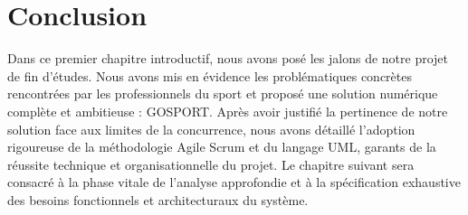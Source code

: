 \section{Conclusion}
Dans ce premier chapitre introductif, nous avons posé les jalons de notre projet de fin d'études. Nous avons mis en évidence les problématiques concrètes rencontrées par les professionnels du sport et proposé une solution numérique complète et ambitieuse : GOSPORT. Après avoir justifié la pertinence de notre solution face aux limites de la concurrence, nous avons détaillé l'adoption rigoureuse de la méthodologie Agile Scrum et du langage UML, garants de la réussite technique et organisationnelle du projet. Le chapitre suivant sera consacré à la phase vitale de l'analyse approfondie et à la spécification exhaustive des besoins fonctionnels et architecturaux du système.
